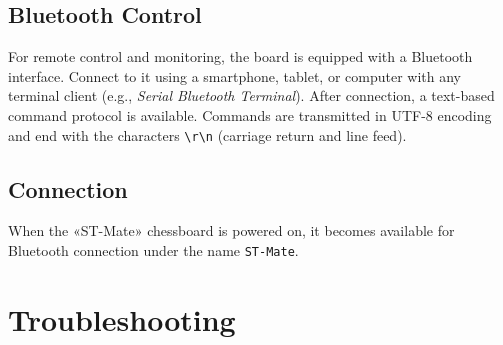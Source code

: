 \documentclass[a4paper,12pt]{article}
\begin{document}
\subsection{Bluetooth Control}
For remote control and monitoring, the board is equipped with a Bluetooth interface.
Connect to it using a smartphone, tablet, or computer with any terminal client (e.g., \textit{Serial Bluetooth Terminal}).
After connection, a text-based command protocol is available.
Commands are transmitted in UTF-8 encoding and end with the characters \texttt{\textbackslash{r}\textbackslash{n}} (carriage return and line feed).

\subsection{Connection}
When the «ST-Mate» chessboard is powered on, it becomes available for Bluetooth connection under the name \texttt{ST-Mate}.

\section{Troubleshooting}
\label{sec:troubleshooting}
\end{document}
